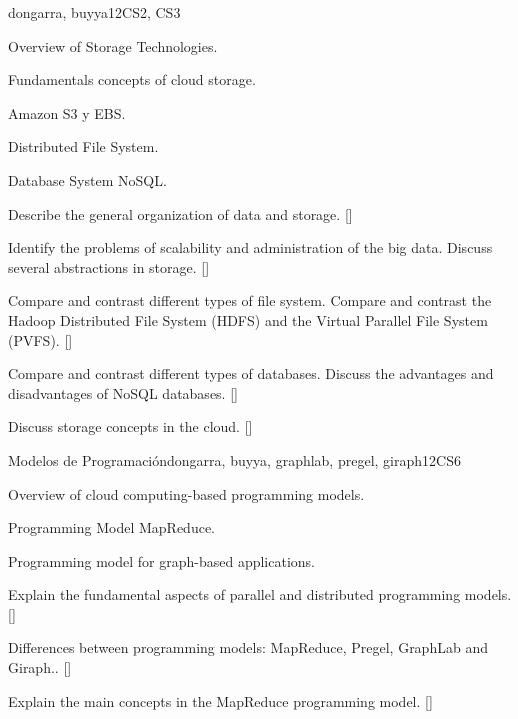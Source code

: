 \begin{syllabus}
\begin{unit}{\PDCloudComputing}{}{dongarra, buyya}{12}{CS2, CS3}
\begin{topics}
    \item \PDCloudComputingTopicCloudBased
    \item Overview of Storage Technologies.
    \item Fundamentals concepts of cloud storage.
    \item Amazon S3 y EBS.
    \item Distributed File System.
    \item Database System  NoSQL.
\end{topics}
\begin{learningoutcomes}
    \item Describe the general organization of data and storage. [\Familiarity]
    \item Identify the problems of scalability and administration of the big data. Discuss several abstractions in storage. [\Familiarity]
    \item Compare and contrast different types of file system. Compare and contrast the Hadoop Distributed File System (HDFS) and the Virtual Parallel File System (PVFS).  [\Usage]
    \item Compare and contrast different types of databases. Discuss the advantages and disadvantages of NoSQL databases. [\Usage]
    \item Discuss storage concepts in the cloud. [\Familiarity]
\end{learningoutcomes}
\end{unit}

\begin{unit}{Modelos de Programación}{}{dongarra, buyya, graphlab, pregel, giraph}{12}{CS6}
\begin{topics}
    \item Overview of cloud computing-based programming models.
    \item Programming Model MapReduce.
    \item Programming model for graph-based applications.
\end{topics}
\begin{learningoutcomes}
    \item Explain the fundamental aspects of parallel and distributed programming models. [\Familiarity]
    \item Differences between programming models: MapReduce, Pregel, GraphLab and Giraph.. [\Usage]
    \item Explain the main concepts in the MapReduce programming model.  [\Usage]
\end{learningoutcomes}
\end{unit}

\begin{coursebibliography}
\end{coursebibliography}

\end{syllabus}
